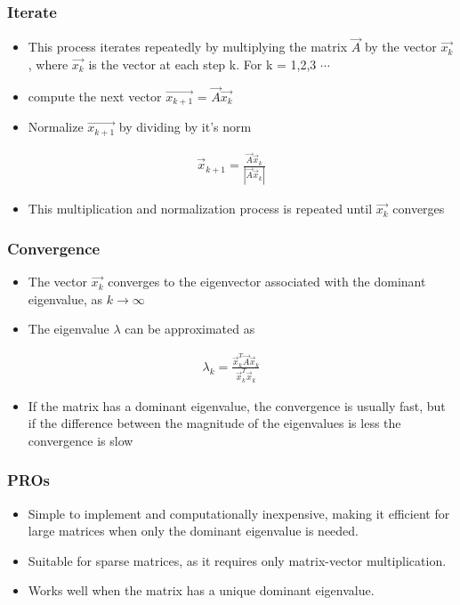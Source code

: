 \documentclass[journal]{IEEEtran}
\begin{document}
\subsubsection{Iterate}
\begin{itemize}
    \item This process iterates repeatedly by multiplying the matrix $\vec{A}$ by the vector $\vec{x_k}$, where $\vec{x_k}$ is the vector at each step k.  For k = 1,2,3 $\cdots$
\end{itemize}
\begin{itemize}
    \item compute the next vector $\vec{x_{k+1}}$ = $\vec{A}\vec{x_k}$
    \item Normalize $\vec{x_{k+1}}$ by dividing by it's norm 
\end{itemize}
\begin{align*} 
\vec{x}_{k+1} = \frac{\vec{A} \vec{x}_k}{|\vec{A} \vec{x}_k|} 
\end{align*}
\begin{itemize}
    \item This multiplication and normalization process is repeated until $\vec{x_k}$ converges \\
\end{itemize}
\subsubsection{Convergence}
\begin{itemize}
    \item The vector $\vec{x_k}$ converges to the eigenvector associated with the dominant eigenvalue, as $k\rightarrow \infty$ 
    \item The eigenvalue $\lambda$ can be approximated as 
\end{itemize}
\begin{align*} 
\lambda_k = \frac{\vec{x}_k^T \vec{A} \vec{x}_k}{\vec{x}_k^T \vec{x}_k} \end{align*}
\begin{itemize}
    \item If the matrix has a dominant eigenvalue, the convergence is usually fast, but if the difference between the magnitude of the eigenvalues is less the convergence is slow \\
\end{itemize}
\subsubsection{PROs}
 \begin{itemize} 
 \item Simple to implement and computationally inexpensive, making it efficient for large matrices when only the dominant eigenvalue is needed. \item Suitable for sparse matrices, as it requires only matrix-vector multiplication. 
 \item Works well when the matrix has a unique dominant eigenvalue.\\ \end{itemize}
\end{document}
